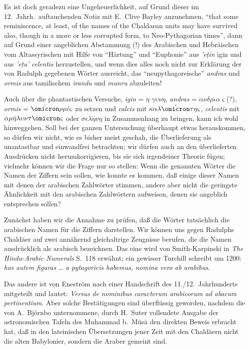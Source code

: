 \documentclass[11pt,a4paper]{article}
\newcommand{\s}[1]{\d{#1}}     %
\newcommand{\enquote}[1]{``#1''}
\begin{document}
Es ist doch geradezu eine Ungeheuerlichkeit, auf Grund dieser im 12.\ Jahrh.\ auftauchenden Notiz mit E.\ Clive Bayley anzunehmen, \enquote{that some reminiscence, at least, of the names of the Chaldaean units may have survived also, though in a more or less corrupted form, to Neo-Pythagorian times}, dann auf Grund einer angeblichen Abstammung (!) des Arabischen und Hebr\"aischen vom Altassyrischen mit Hilfe von \enquote{H\"artung} und \enquote{Euphonie} aus \textit{'e\s{t}in} igin und aus \textit{'e\s{t}u'} \textit{celentis} herzustellen, und wenn dies alles noch nicht zur Erkl\"arung der von Radulph gegebenen W\"orter ausreicht, das \enquote{neupythagoreische} \textit{andras} und \textit{ormis} aus tamilischem \textit{irandu} und \textit{munru} abzuleiten!

Auch \"uber die phantastischen Versuche, \textit{igin} = $\dot{\eta}$ $\gamma\upsilon\nu\dot{\eta}$, \textit{andras} = $\dot{\alpha}\nu\delta\rho\acute{\iota}\alpha\varsigma$(?), \textit{ormis} = $\dot{\omicron}\rho\mu\acute{\iota}\varsigma$ zu setzen und \textit{calcis} mit $\kappa\alpha\lambda\acute{\omicron}\tau\eta\varsigma$, \textit{celentis} mit $\dot{\alpha}\mu\dot{\eta}\lambda\upsilon\nu\tau\omicron\varsigma$ oder $\sigma\epsilon\lambda\dot{\eta}\nu\eta$ in Zusammenhang zu bringen, kann ich wohl hinweggehen. Soll bei der ganzen Untersuchung \"uberhaupt etwas herauskommen, so d\"urfen wir nicht, wie es bisher meist geschah, die \"Uberlieferung als unantastbar und einwandfrei betrachten; wir d\"urfen auch an den \"uberlieferten Ausdr\"ucken nicht herumkorrigieren, bis sie sich irgendeiner Theorie f\"ugen; vielmehr k\"onnen wir die Frage nur so stellen: Wenn die genannten W\"orter die Namen der Ziffern sein sollen, wie konnte es kommen, da\ss{} einige dieser Namen mit denen der arabischen Zahlw\"orter stimmen, andere aber nicht die geringste \"Ahnlichkeit mit den arabischen Zahlw\"ortern aufweisen, denen sie angeblich entsprechen sollen?

Zun\"achst haben wir die Annahme zu pr\"ufen, da\ss{} die W\"orter tats\"achlich die arabischen Namen f\"ur die Ziffern darstellen. Wir k\"onnen uns gegen Radulphs Chald\"aer auf zwei ann\"ahernd gleichaltrige Zeugnisse berufen, die die Namen ausdr\"ucklich als arabisch bezeichnen. Das eine wird von Smith-Karpinski in \textit{The Hindu-Arabic Numerals} S.\ 118 erw\"ahnt; ein gewisser Turchill schreibt um 1200: \textit{has autem figuras \ldots{} a pytagoricis habemus, nomina vero ab arabibus}.

Das andere ist von Enestr\"om nach einer Handschrift des 11./12.\ Jahrhunderts mitgeteilt und lautet: \textit{Versus de nominibus caracterum arabicorum ad abacum pertinentium}. Aber solche Best\"atigungen sind \"uberfl\"ussig geworden, nachdem die von A.\ Bj\"ornbo unternommene, durch H.\ Suter vollendete Ausgabe der astronomischen Tafeln des Muhammad b.\ M\"us\=a den direkten Beweis erbracht hat, da\ss{} in den lateinischen \"Ubersetzungen jener Zeit mit den Chald\"aern nicht die alten Babylonier, sondern die Araber gemeint sind.
\end{document}
